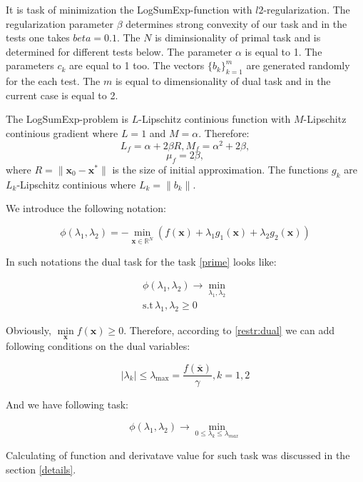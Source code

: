 \documentclass[12pt]{article}
\begin{document}
It is task of minimization the LogSumExp-function with $l2$-regularization. The regularization parameter $\beta$ determines strong convexity of our task and in the tests one takes $beta=0.1$. The $N$ is diminsionality of primal task and is determined for different tests below. The parameter $\alpha$ is equal to 1. The parameters $c_k$ are equal to 1 too. The vectors $\{b_k\}_{k=1}^m$ are generated randomly for the each test. The $m$ is equal to dimensionality of dual task and in the current case is equal to 2.

The LogSumExp-problem is $L$-Lipschitz continious function with $M$-Lipschitz continious gradient where $L=1$ and $M=\alpha$. Therefore:
$$L_f = \alpha+2\beta R, M_f = \alpha^2 + 2\beta,$$
$$\mu_f = 2\beta,$$
where $R=\|\textbf{x}_0-\textbf{x}^*\|$ is the size of initial approximation. The functions $g_k$ are $L_k$-Lipschitz continious where $L_k=\|b_k\|$. 

We introduce the following notation:

\begin{equation}
\label{phi}
\phi(\lambda_1, \lambda_2) = -\min\limits_{\textbf{x}\in \mathbb{R}^N}\left(f(\textbf{x}) +\lambda_1 g_1(\textbf{x}) +\lambda_2g_2(\textbf{x})\right)
\end{equation}

In such notations the dual task for the task \ref{prime} looks like:

\begin{gather}
\phi(\lambda_1, \lambda_2) \rightarrow \min\limits_{\lambda_1, \lambda_2}\\
\text{s.t}\, \lambda_1, \lambda_2 \geq 0
\end{gather}
 
Obviously, $\min\limits_{\textbf{x}}f(\textbf{x}) \geq 0$. Therefore, according to \ref{restr:dual} we can add following conditions on the dual variables:

$$|\lambda_k| \leq \lambda_{\text{max}}=\frac{f(\overline{\textbf{x}})}{\gamma}, k=1,2$$

And we have following task:

$$\phi(\lambda_1, \lambda_2) \rightarrow \min_{0\leq\lambda_k\leq\lambda_{max}}$$

Calculating of function and derivatave value for such task was discussed in the section \ref{details}.
\end{document}

